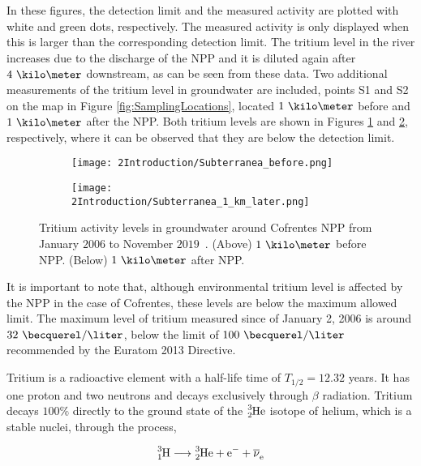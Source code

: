 In these figures, the detection limit and the measured activity are plotted with white and green dots, respectively. The measured activity is only displayed when this is larger than the corresponding detection limit. The tritium level in the river increases due to the discharge of the NPP and it is diluted again after $4~\kilo\meter$ downstream, as can be seen from these data. Two additional measurements of the tritium level in groundwater are included, points S1 and S2 on the map in Figure \ref{fig:SamplingLocations}, located $1~\kilo\meter$ before and $1~\kilo\meter$ after the NPP. Both tritium levels are shown in Figures \ref{subfig:TritiumLG1kB} and \ref{subfig:TritiumLG1kA}, respectively, where it can be observed that they are below the detection limit.

\begin{figure}
\centering
    \begin{subfigure}[b]{0.7\textwidth}
    \centering
    \texttt{[image: 2Introduction/Subterranea\_before.png]}  
    \caption{\label{subfig:TritiumLG1kB}}
    \end{subfigure}
    \hfill
    \begin{subfigure}[b]{0.7\textwidth}
    \centering
    \texttt{[image: 2Introduction/Subterranea\_1\_km\_later.png]}  
    \caption{\label{subfig:TritiumLG1kA}}
    \end{subfigure}
 \caption{Tritium activity levels in groundwater around Cofrentes NPP from January $2006$ to November $2019$~\cite{REM}. (Above) $1~\kilo\meter$ before NPP. (Below) $1~\kilo\meter$ after NPP.}
 \label{fig:MeasurementsCofrentesGroundWater}
\end{figure}

It is important to note that, although environmental tritium level is affected by the NPP in the case of Cofrentes, these levels are below the maximum allowed limit. The maximum level of tritium measured since of January 2, 2006 is around $32~\becquerel/\liter$, below the limit of $100~\becquerel/\liter$ recommended by the Euratom 2013 Directive.

Tritium is a radioactive element with a half-life time of $T_{1/2}= 12.32$ years. It has one proton and two neutrons and decays exclusively through $\beta$ radiation. Tritium decays $100\%$ directly to the ground state of the $\ce{^{3}_{2}He}$ isotope of helium, which is a stable nuclei, through the process,

\begin{equation}
\ce{^{3}_{1}H} \longrightarrow \ce{^{3}_{2}He}  + \ce{e^-}  + \ce{\overline{\nu}_e}
\label{eq:TritiumDecay}
\end{equation}

